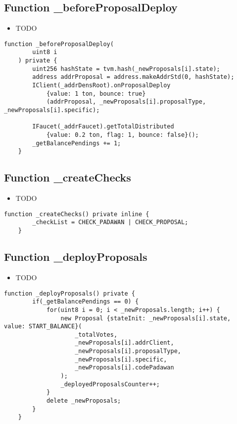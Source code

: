 \subsection{Function \_{}beforeProposalDeploy}

\begin{itemize}
\item TODO
\end{itemize}

\begin{lstlisting}[firstnumber=134]
    function _beforeProposalDeploy(
        uint8 i
    ) private {
        uint256 hashState = tvm.hash(_newProposals[i].state);
        address addrProposal = address.makeAddrStd(0, hashState);
        IClient(_addrDensRoot).onProposalDeploy
            {value: 1 ton, bounce: true}
            (addrProposal, _newProposals[i].proposalType, _newProposals[i].specific);

        IFaucet(_addrFaucet).getTotalDistributed
            {value: 0.2 ton, flag: 1, bounce: false}();
        _getBalancePendings += 1;
    }
\end{lstlisting}

\subsection{Function \_{}createChecks}

\begin{itemize}
\item TODO
\end{itemize}

\begin{lstlisting}[firstnumber=54]
    function _createChecks() private inline {
        _checkList = CHECK_PADAWAN | CHECK_PROPOSAL;
    }
\end{lstlisting}

\subsection{Function \_{}deployProposals}

\begin{itemize}
\item TODO
\end{itemize}

\begin{lstlisting}[firstnumber=156]
    function _deployProposals() private {
        if(_getBalancePendings == 0) {
            for(uint8 i = 0; i < _newProposals.length; i++) {
                new Proposal {stateInit: _newProposals[i].state, value: START_BALANCE}(
                    _totalVotes,
                    _newProposals[i].addrClient,
                    _newProposals[i].proposalType,
                    _newProposals[i].specific,
                    _newProposals[i].codePadawan
                );
                _deployedProposalsCounter++;
            }
            delete _newProposals;
        }
    }
\end{lstlisting}

